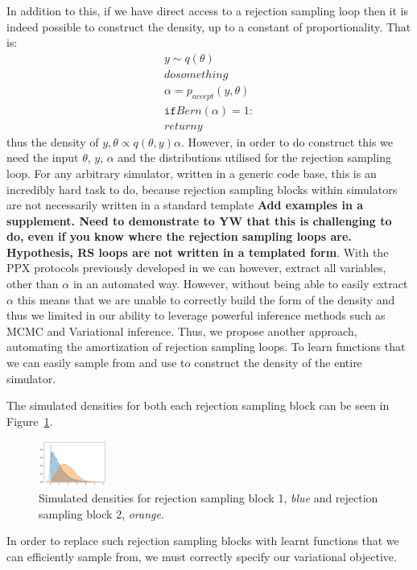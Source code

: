 \documentclass{article}
\begin{document}
In addition to this, if we have direct access to a rejection sampling loop then it is indeed 
possible to construct the density, up to a constant of proportionality. 
That is:
\begin{align*}
y \sim q(\theta) \\
do something \\
\alpha = p_{accept}(y,\theta) \\
\mathtt{if} Bern(\alpha) = 1: \\
return y
\end{align*}
thus the density of $y,\theta \propto q(\theta, y) \alpha$.
However, in order to do construct this we need the input $\theta$, $y$, $\alpha$ and the distributions utilised for the rejection sampling loop. 
For any arbitrary simulator, written in a generic code base, this is an incredibly hard 
task to do, because rejection sampling blocks within simulators are not necessarily written in a standard template
\textbf{Add examples in a supplement.  Need to demonstrate to YW that this is challenging to do, even if you know where 
the rejection sampling loops are. Hypothesis, RS loops are not written in a templated form}. With the PPX protocols previously developed in \cite{baydin2018efficient,gram2019hijacking} we can however, 
extract all variables, other than $\alpha$ in an automated way.
However, without being able to easily extract $\alpha$ this means that we are unable to 
correctly build the form of the density and thus we limited in our ability to leverage 
powerful inference methods such as MCMC and Variational inference.
Thus, we propose another approach, automating the amortization of rejection sampling loops. 
To learn functions that we can easily sample from and use to construct the density of the entire
simulator. 


The simulated densities for both each rejection sampling block can be seen in Figure~\ref{fig:rs_simulated}.
\begin{figure}
  \centering
  \includegraphics[width=0.2\textwidth, height=0.2\textheight, keepaspectratio]{rs_plots.png}
  \caption{ Simulated densities for rejection sampling block 1, \emph{blue} and rejection
  sampling block 2, \emph{orange}.}
  \label{fig:rs_simulated}
\end{figure}

In order to replace such rejection sampling blocks with learnt functions that we 
can efficiently sample from, we must correctly specify our variational objective.
\end{document}
